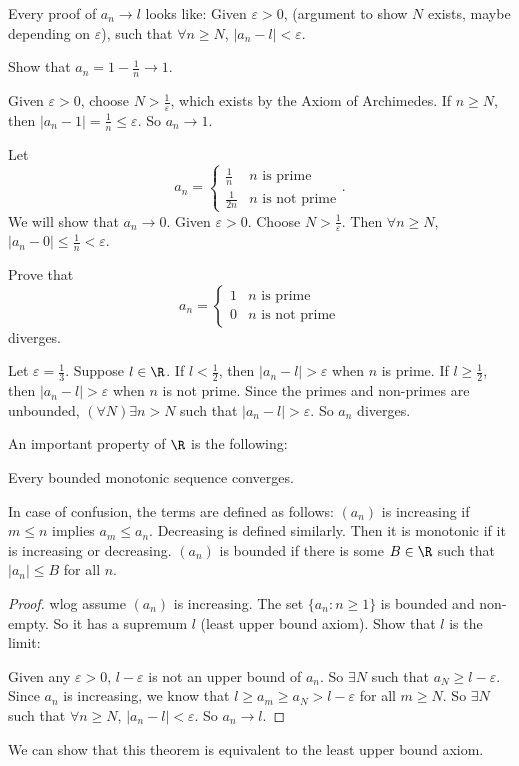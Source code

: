 \documentclass[a4paper]{article}
\begin{document}
Every proof of $a_n \to l$ looks like: Given $\varepsilon > 0$, (argument to show $N$ exists, maybe depending on $\varepsilon$), such that $\forall n\geq N$, $|a_n - l| < \varepsilon$.
\begin{eg}
  Show that $a_n = 1 - \frac{1}{n} \to 1$.

  Given $\varepsilon > 0$, choose $N > \frac{1}{\varepsilon}$, which exists by the Axiom of Archimedes. If $n \geq N$, then $|a_n - 1| = \frac{1}{n} \leq \varepsilon$. So $a_n\to 1$.
\end{eg}

\begin{eg}
  Let
  \[
    a_n = \begin{cases}\frac{1}{n} & n\text{ is prime}\\ \frac{1}{2n} & n\text{ is not prime}\end{cases}.
  \]
  We will show that $a_n \to 0$. Given $\varepsilon > 0$. Choose $N > \frac{1}{\varepsilon}$. Then $\forall n\geq N$, $|a_n - 0| \leq \frac{1}{n} < \varepsilon$.
\end{eg}

\begin{eg}
  Prove that
  \[
    a_n = \begin{cases}1 & n\text{ is prime}\\ 0 & n\text{ is not prime}\end{cases}
  \]
  diverges.

  Let $\varepsilon = \frac{1}{3}$. Suppose $l\in \R$. If $l < \frac{1}{2}$, then $|a_n - l| > \varepsilon$ when $n$ is prime. If $l\geq \frac{1}{2}$, then $|a_n - l| > \varepsilon$ when $n$ is not prime. Since the primes and non-primes are unbounded, $(\forall N)\exists n > N$ such that $|a_n - l| > \varepsilon$. So $a_n$ diverges.
\end{eg}

An important property of $\R$ is the following:
\begin{thm}
  Every bounded monotonic sequence converges.
\end{thm}
In case of confusion, the terms are defined as follows: $(a_n)$ is increasing if $m \leq n$ implies $a_m \leq a_n$. Decreasing is defined similarly. Then it is monotonic if it is increasing or decreasing. $(a_n)$ is bounded if there is some $B\in \R$ such that $|a_n| \leq B$ for all $n$.

\begin{proof}
  wlog assume $(a_n)$ is increasing. The set $\{a_n: n\geq 1\}$ is bounded and non-empty. So it has a supremum $l$ (least upper bound axiom). Show that $l$ is the limit:

  Given any $\varepsilon >0$, $l - \varepsilon$ is not an upper bound of $a_n$. So $\exists N$ such that $a_N \geq l - \varepsilon$. Since $a_n$ is increasing, we know that $l \geq a_m \geq a_N > l - \varepsilon$ for all $m \geq N$. So $\exists N $ such that $\forall n\geq N$, $|a_n - l| < \varepsilon$. So $a_n \to l$.
\end{proof}
We can show that this theorem is equivalent to the least upper bound axiom.
\end{document}
